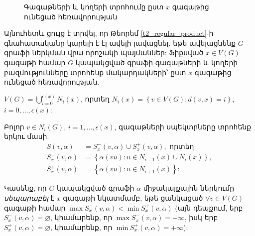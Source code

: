 \begin{hide}
\begin{figure}[t]
\caption{Գագաթների և կողերի տրոհումը ըստ $x$ գագաթից ունեցած հեռավորության}
\label{graphLevels}
\end{figure}
\end{hide}

Այնուհետև ցույց է տրվել, որ Թեորեմ \ref{t2_regular_product}-ի գնահատականը կարելի է էլ ավելի լավացնել, եթե ավելացնենք $G$ գրաֆի ներկման վրա որոշակի պայմաններ: Ֆիքսված $x \in V(G)$ գագաթի համար $G$ կապակցված գրաֆի գագաթների և կողերի բազմությունները տրոհենք մակարդակների՝ ըստ $x$ գագաթից ունեցած հեռավորության.
\begin{center}
$V(G) = \bigcup_{i=0}^{\epsilon(x)}N_i(x)$, որտեղ 
$N_i(x)=\left\{ v \in V(G) : d(v,x)=i \right\}$, $i=0,\ldots,\epsilon(x)$:
\end{center}
Բոլոր $v \in N_i(G)$, $i=1,\ldots,\epsilon(x)$, գագաթների սպեկտրները տրոհենք երկու մասի.
\begin{align*}
S(v,\alpha) &= S_x^-(v,\alpha) \cup S_x^+(v,\alpha),\text{ որտեղ}\\
S_x^-(v,\alpha) &= \left\{ \alpha(vu) : u\in N_{i-1}(x) \cup N_i(x) \right\},\\
S_x^+(v,\alpha) &= \left\{ \alpha(vu) : u\in N_{i+1}(x) \right\}:
\end{align*}

Կասենք, որ $G$ կապակցված գրաֆի $\alpha$ միջակայքային ներկումը \textit{սեպարաբել} է $x$ գագաթի նկատմամբ, եթե ցանկացած $\forall v \in V(G)$ գագաթի համար $\max S_x^-(v,\alpha) < \min S_x^+(v,\alpha)$ (այն դեպքում, երբ $S_x^-(v,\alpha)=\varnothing$, կհամարենք, որ $\max{S_x^-(v,\alpha)}=-\infty$, իսկ երբ $S_x^+(v,\alpha)=\varnothing$, կհամարենք, որ $\min{S_x^+(v,\alpha)}=+\infty$):

